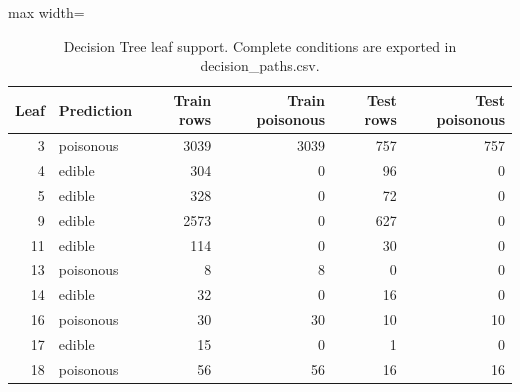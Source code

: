 \begin{table}[H]
\centering\small
\caption{Decision Tree leaf support. Complete conditions are exported in decision\_paths.csv.}
\begin{adjustbox}{max width=\linewidth}\begin{tabular}{rlrrrr}
\toprule
Leaf & Prediction & Train rows & Train poisonous & Test rows & Test poisonous \\
\midrule
3 & poisonous & 3039 & 3039 & 757 & 757 \\
4 & edible & 304 & 0 & 96 & 0 \\
5 & edible & 328 & 0 & 72 & 0 \\
9 & edible & 2573 & 0 & 627 & 0 \\
11 & edible & 114 & 0 & 30 & 0 \\
13 & poisonous & 8 & 8 & 0 & 0 \\
14 & edible & 32 & 0 & 16 & 0 \\
16 & poisonous & 30 & 30 & 10 & 10 \\
17 & edible & 15 & 0 & 1 & 0 \\
18 & poisonous & 56 & 56 & 16 & 16 \\
\bottomrule
\end{tabular}\end{adjustbox}
\end{table}
